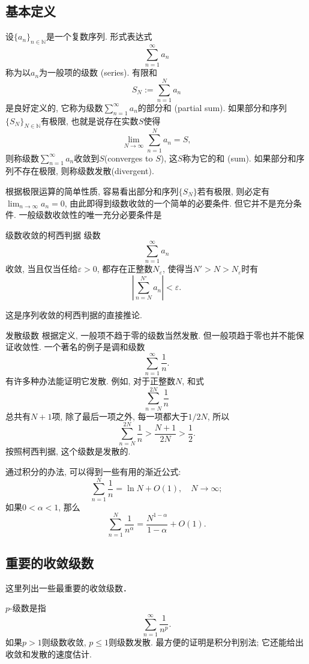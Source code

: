 

\subsection{基本定义}
设$\{a_n\}_{n\in\mathbb{N}}$是一个复数序列. 形式表达式
\[
\sum_{n=1}^\infty a_n
\]
称为以$a_n$为一般项的级数 (series). 有限和
\[
S_N:=\sum_{n=1}^N a_n
\]
是良好定义的, 它称为级数$\sum_{n=1}^\infty a_n$的部分和 (partial sum). 如果部分和序列$\{S_N\}_{N\in\mathbb{N}}$有极限, 也就是说存在实数$S$使得
\[
\lim_{N\to\infty}\sum_{n=1}^N a_n=S,
\] 
则称级数$\sum_{n=1}^\infty a_n$收敛到$S$(converges to $S$), 这$S$称为它的和 (sum). 如果部分和序列不存在极限, 则称级数发散(divergent). 

根据极限运算的简单性质, 容易看出部分和序列$\{S_N\}$若有极限, 则必定有$\lim_{n\to\infty}a_n=0$, 由此即得到级数收敛的一个简单的必要条件. 但它并不是充分条件. 一般级数收敛性的唯一充分必要条件是
\begin{theorem}{级数收敛的柯西判据}
级数
\[
\sum_{n=1}^\infty a_n
\]
收敛, 当且仅当任给$\varepsilon>0$, 都存在正整数$N_\varepsilon$, 使得当$N'>N>N_\varepsilon$时有
$$
\left|\sum_{n=N}^{N'} a_n\right|<\varepsilon.
$$
\end{theorem}
这是序列收敛的柯西判据的直接推论.

\begin{example}{发散级数}
根据定义, 一般项不趋于零的级数当然发散. 但一般项趋于零也并不能保证收敛性. 一个著名的例子是调和级数
$$
\sum_{n=1}^\infty\frac{1}{n}.
$$
有许多种办法能证明它发散. 例如, 对于正整数$N$, 和式
$$
\sum_{n=N}^{2N}\frac{1}{n}
$$
总共有$N+1$项, 除了最后一项之外, 每一项都大于$1/2N$, 所以
$$
\sum_{n=N}^{2N}\frac{1}{n}>\frac{N+1}{2N}>\frac{1}{2}.
$$
按照柯西判据, 这个级数是发散的.

通过积分的办法, 可以得到一些有用的渐近公式:
$$
\sum_{n=1}^{N}\frac{1}{n}=\ln N+O(1),\quad N\to\infty;
$$
如果$0<\alpha<1$, 那么
$$
\sum_{n=1}^{N}\frac{1}{n^\alpha}=\frac{N^{1-\alpha}}{1-\alpha}+O(1).
$$
\end{example}

\subsection{重要的收敛级数}

这里列出一些最重要的收敛级数．

$p$-级数是指
$$
\sum_{n=1}^\infty\frac{1}{n^p}.
$$
如果$p>1$则级数收敛, $p\leq1$则级数发散. 最方便的证明是积分判别法; 它还能给出收敛和发散的速度估计.

